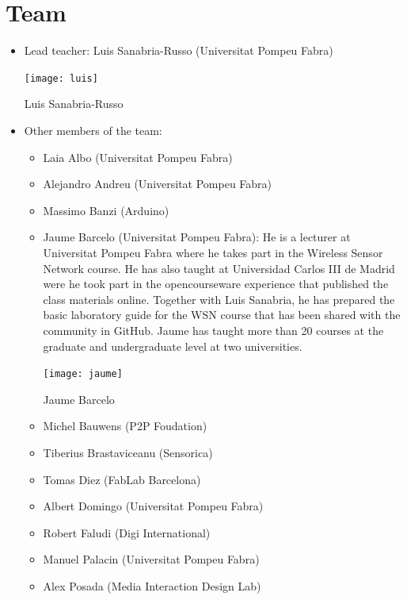 \documentclass{tufte-book} %
\begin{document}

\chapter{Team}

\begin{itemize}
\item Lead teacher: Luis Sanabria-Russo (Universitat Pompeu Fabra)
\begin{marginfigure}
\texttt{[image: luis]}
\caption{Luis Sanabria-Russo}
\label{fig:luis}
\end{marginfigure}
\item Other members of the team:
\begin{itemize}
\item Laia Albo (Universitat Pompeu Fabra)
\item Alejandro Andreu (Universitat Pompeu Fabra)
\item Massimo Banzi (Arduino)
\item Jaume Barcelo (Universitat Pompeu Fabra): He is a lecturer at Universitat Pompeu Fabra where he takes part in the Wireless Sensor Network course. He has also taught at Universidad Carlos III de Madrid were he took part in the opencourseware experience that published the class materials online. Together with Luis Sanabria, he has prepared the basic laboratory guide for the WSN course that has been shared with the community in GitHub. Jaume has taught more than 20 courses at the graduate and undergraduate level at two universities.
\begin{marginfigure}
\texttt{[image: jaume]}
\caption{Jaume Barcelo}
\label{fig:jaume}
\end{marginfigure}

\item Michel Bauwens (P2P Foudation)
\item Tiberius Brastaviceanu (Sensorica)
\item Tomas Diez (FabLab Barcelona)
\item Albert Domingo (Universitat Pompeu Fabra)
\item Robert Faludi (Digi International)
\item Manuel Palacin (Universitat Pompeu Fabra)
\item Alex Posada (Media Interaction Design Lab)
\end{itemize}
\end{itemize}



\backmatter




\printindex %
\end{document}
